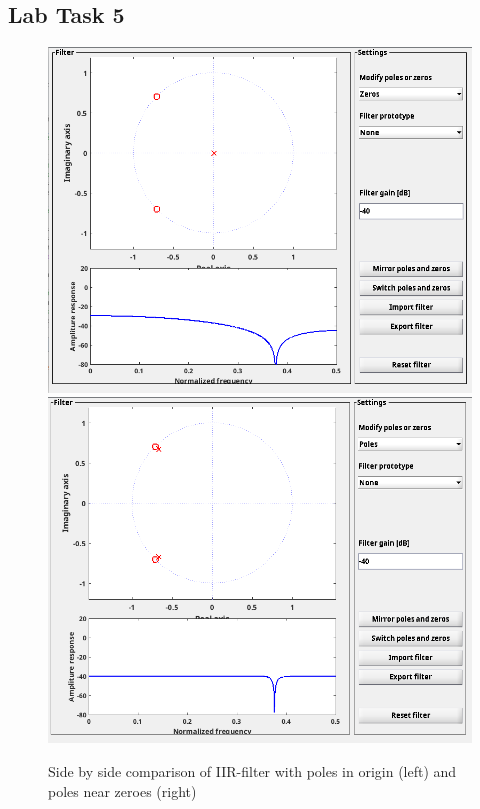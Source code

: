 \documentclass[a4paper,11pt]{article}
\begin{document}
\subsection{Lab Task 5}
\begin{figure}[H]
    \centering
    \includegraphics[scale=0.4]{./images/pole-center.png}
    \includegraphics[scale=0.4]{./images/pole-zero.png}

    \caption{Side by side comparison of IIR-filter with poles in origin (left) and poles near zeroes (right)}
    \label{fig:my_label}
\end{figure}
\end{document}
